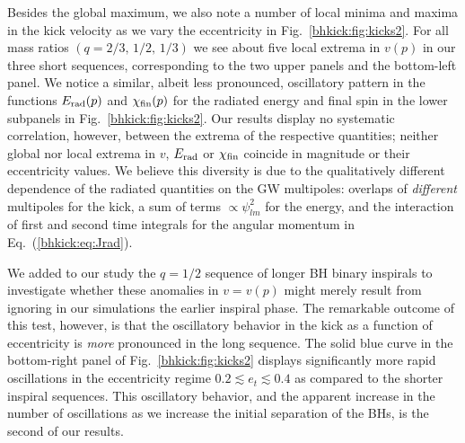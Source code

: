 Besides the global maximum, we also note a number of local minima and
maxima in the kick velocity as we vary the eccentricity in
Fig.~\ref{bhkick:fig:kicks2}. For all mass ratios $(q=2/3,\,1/2,\,1/3)$ we
see about five
local extrema in $v(p)$ in our three short sequences,
corresponding to the two upper panels and the bottom-left panel.
We notice a similar, albeit less pronounced,
oscillatory pattern in the functions
$E_{\rm rad}(p)$ and $\chi_{\rm fin}(p)$ for the radiated
energy and final spin in the lower subpanels in
Fig.~\ref{bhkick:fig:kicks2}. Our results display no systematic
correlation, however, between the extrema of the respective
quantities; neither global nor local extrema in $v$,
$E_{\rm rad}$ or $\chi_{\rm fin}$ coincide in
magnitude or their eccentricity values.
We believe this diversity is due to the qualitatively
different dependence of the radiated quantities on the
GW multipoles: overlaps of {\it different} multipoles for the
kick, a sum of terms $\propto \psi_{lm}^2$ for the energy,
and the interaction of first and second time integrals
for the angular momentum in Eq.~(\ref{bhkick:eq:Jrad}).

We added
to our study the $q = 1/2$ sequence of longer BH binary inspirals to
investigate whether these anomalies in $v=v(p)$ might merely result
from ignoring in our simulations the earlier inspiral phase. The
remarkable outcome of this test, however, is that the oscillatory
behavior in the kick as a function of eccentricity is \emph{more}
pronounced in the long sequence.  The solid blue curve in the
bottom-right panel of Fig.~\ref{bhkick:fig:kicks2} displays significantly more
rapid oscillations in the eccentricity regime
$0.2\lesssim e_t \lesssim 0.4$ as compared to the shorter inspiral
sequences.  This oscillatory behavior, and the apparent increase in
the number of oscillations as we increase the initial separation of
the BHs, is the second of our results.

